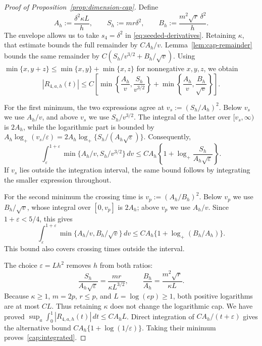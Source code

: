 \documentclass[11pt,letterpaper]{article}
\theoremstyle{remark}
\begin{document}
\begin{proof}[Proof of Proposition~\ref{prop:dimension-cap}]
Define
\[
 A_h:=\frac{\delta^2\kappa L}h,\qquad
 S_h:=mr\delta^2,\qquad
 B_h:=\frac{m^2\sqrt r\,\delta^2}h.
\]
The envelope allows us to take $s_4=\delta^2$ in
\eqref{eq:seeded-derivatives}. Retaining $\kappa$, that estimate
bounds the full remainder by $CA_h/v$. Lemma~\ref{lem:cap-remainder} bounds the same
remainder by $C(S_h/v^{3/2}+B_h/\sqrt v)$.
Using $\min\{x,y+z\}\le\min\{x,y\}+\min\{x,z\}$ for
nonnegative $x,y,z$, we obtain
\[
 |R_{4,a,h}(t)|\le C\left[
 \min\left\{\frac{A_h}v,\frac{S_h}{v^{3/2}}\right\}
 +\min\left\{\frac{A_h}v,\frac{B_h}{\sqrt v}\right\}\right].
\]

For the first minimum, the two expressions agree at
$v_s:=(S_h/A_h)^2$. Below $v_s$ we use $A_h/v$, and above
$v_s$ we use $S_h/v^{3/2}$. The integral of the latter
over $[v_s,\infty)$ is $2A_h$, while the logarithmic part
is bounded by
$A_h\log_+(v_s/\varepsilon)
 =2A_h\log_+\{S_h/(A_h\sqrt\varepsilon)\}$.
Consequently,
\[
 \int_\varepsilon^{1+\varepsilon}
       \min\{A_h/v,S_h/v^{3/2}\}\,dv
 \le CA_h\left\{1+\log_+
                    \frac{S_h}{A_h\sqrt\varepsilon}\right\}.
\]
If $v_s$ lies outside the integration interval, the same bound
follows by integrating the smaller expression throughout.

For the second minimum the crossing time is
$v_p:=(A_h/B_h)^2$. Below $v_p$ we use $B_h/\sqrt v$,
whose integral over $[0,v_p]$ is $2A_h$; above $v_p$ we use
$A_h/v$. Since $1+\varepsilon<5/4$, this gives
\[
 \int_\varepsilon^{1+\varepsilon}
       \min\{A_h/v,B_h/\sqrt v\}\,dv
 \le CA_h\{1+\log_+(B_h/A_h)\}.
\]
This bound also covers crossing times outside the interval.

The choice $\varepsilon=Lh^2$ removes $h$ from both ratios:
\[
 \frac{S_h}{A_h\sqrt\varepsilon}=\frac{mr}{\kappa L^{3/2}},
 \qquad \frac{B_h}{A_h}=\frac{m^2\sqrt r}{\kappa L}.
\]
Because $\kappa\ge1$, $m=2p$, $r\le p$, and $L=\log(ep)\ge1$,
both positive logarithms are at most $CL$. Thus retaining $\kappa$
does not change the logarithmic cap.
We have proved
$\sup_a\int_0^1|R_{4,a,h}(t)|\,dt\le CA_hL$.
Direct integration of $CA_h/(t+\varepsilon)$ gives the
alternative bound $CA_h\{1+\log(1/\varepsilon)\}$.
Taking their minimum proves~\eqref{cap:integrated}.


\end{proof}
\end{document}
